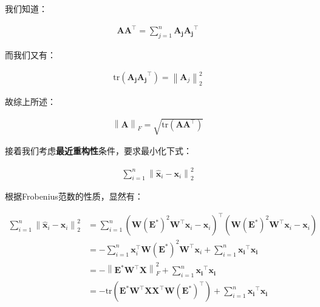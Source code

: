 \documentclass[UTF8]{book}
\begin{document}
我们知道：
\begin{large}
    \begin{equation}
        \begin{aligned}
            \mathbf{A}\mathbf{A}^\top=\sum_{j=1}^{n}\mathbf{A_j}\mathbf{A_j}^\top
            \nonumber
        \end{aligned}
    \end{equation}
\end{large}
而我们又有：
\begin{large}
    \begin{equation}
        \begin{aligned}
            \mathrm{tr}(\mathbf{A_j}\mathbf{A_j}^\top)=\left\| \mathbf{A}_j \right\|_2^2
            \nonumber
        \end{aligned}
    \end{equation}
\end{large}
故综上所述：
\begin{large}
    \begin{equation}
        \begin{aligned}
            \left\| \mathbf{A} \right\|_F = \sqrt{\mathrm{tr}(\mathbf{A}\mathbf{A}^\top)}
            \nonumber
        \end{aligned}
    \end{equation}
\end{large}
接着我们考虑\textbf{最近重构性}条件，要求最小化下式：
\begin{large}
    \begin{equation}
        \begin{aligned}
            \sum_{i=1}^{n} \left\| \hat{\mathbf{x}}_i - \mathbf{x}_i \right\|_2^2
            \nonumber
        \end{aligned}
    \end{equation}
\end{large}
根据Frobenius范数的性质，显然有：
\begin{large}
    \begin{equation}
        \begin{aligned}
            \sum_{i=1}^{n} \left\| \hat{\mathbf{x}}_i - \mathbf{x}_i \right\|_2^2 &= \sum_{i=1}^{n} \left( \mathbf{W}(\mathbf{E}^*)^2\mathbf{W}^\top \mathbf{x}_i - \mathbf{x}_i \right)^\top \left( \mathbf{W}(\mathbf{E}^*)^2\mathbf{W}^\top \mathbf{x}_i - \mathbf{x}_i \right) \\
            &= -\sum_{i=1}^{n} \mathbf{x}_i^\top \mathbf{W}(\mathbf{E}^*)^2\mathbf{W}^\top \mathbf{x}_i + \sum_{i=1}^{n} \mathbf{x_i}^\top \mathbf{x_i} \\
            &= -\left\| \mathbf{E}^*\mathbf{W}^\top \mathbf{X} \right\|_F^2 + \sum_{i=1}^{n} \mathbf{x_i}^\top \mathbf{x_i} \\
            &= -\mathrm{tr}\left( \mathbf{E}^*\mathbf{W}^\top \mathbf{X}\mathbf{X}^\top \mathbf{W} (\mathbf{E}^*)^\top \right) + \sum_{i=1}^{n} \mathbf{x_i}^\top \mathbf{x_i}
            \nonumber
        \end{aligned}
    \end{equation}
\end{large}
\end{document}
